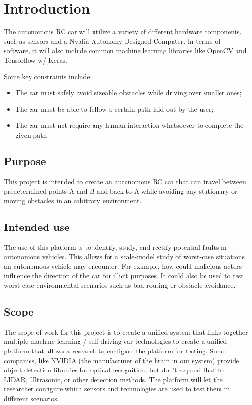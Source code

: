 \documentclass[onecolumn, draftclsnofoot,10pt]{IEEEtran}
\begin{document}
\clearpage



\section{Introduction}
    The autonomous RC car will utilize a variety of different hardware components, such as sensors and a Nvidia Autonomy-Designed Computer. In terms of software, it will also include common machine learning libraries like OpenCV and Tensorflow w/ Keras. 
    
    Some key constraints include: 
    \begin{itemize}
        \item The car must safely avoid sizeable obstacles while driving over smaller ones;
        \item The car must be able to follow a certain path laid out by the user;
        \item The car must not require any human interaction whatsoever to complete the given path
    \end{itemize}

\subsection{Purpose}
    This project is intended to create an autonomous RC car that can travel between predetermined points A and B and back to A while avoiding any stationary or moving obstacles in an arbitrary environment.
\bigskip

\subsection{Intended use}
    The use of this platform is to identify, study, and rectify potential faults in autonomous vehicles. This allows for a scale-model study of worst-case situations an autonomous vehicle may encounter. For example, how could malicious actors influence the direction of the car for illicit purposes. It could also be used to test worst-case environmental scenarios such as bad routing or obstacle avoidance.
\bigskip

\subsection{Scope}
    The scope of work for this project is to create a unified system that links together multiple machine learning / self driving car technologies to create a unified platform that allows a research to configure the platform for testing. Some companies, like NVIDIA (the manufacturer of the brain in our system) provide object detection libraries for optical recognition, but don't expand that to LIDAR, Ultrasonic, or other detection methods. The platform will let the researcher configure which sensors and technologies are used to test them in different scenarios.
\bigskip
\end{document}
